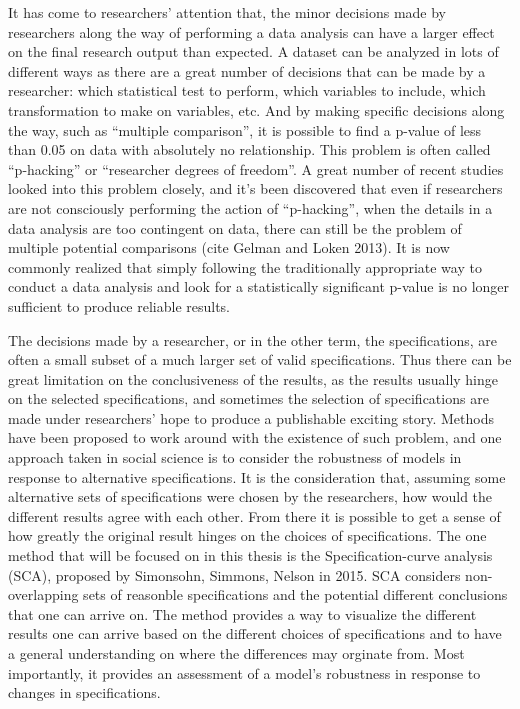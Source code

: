 \documentclass[12pt,twoside]{reedthesis}
\begin{document}
  It has come to researchers' attention that, the minor decisions made by
  researchers along the way of performing a data analysis can have a
  larger effect on the final research output than expected. A dataset can
  be analyzed in lots of different ways as there are a great number of
  decisions that can be made by a researcher: which statistical test to
  perform, which variables to include, which transformation to make on
  variables, etc. And by making specific decisions along the way, such as
  ``multiple comparison'', it is possible to find a p-value of less than
  0.05 on data with absolutely no relationship. This problem is often
  called ``p-hacking'' or ``researcher degrees of freedom''. A great
  number of recent studies looked into this problem closely, and it's been
  discovered that even if researchers are not consciously performing the
  action of ``p-hacking'', when the details in a data analysis are too
  contingent on data, there can still be the problem of multiple potential
  comparisons (cite Gelman and Loken 2013). It is now commonly realized
  that simply following the traditionally appropriate way to conduct a
  data analysis and look for a statistically significant p-value is no
  longer sufficient to produce reliable results.
  
  \par 
  
  The decisions made by a researcher, or in the other term, the
  specifications, are often a small subset of a much larger set of valid
  specifications. Thus there can be great limitation on the conclusiveness
  of the results, as the results usually hinge on the selected
  specifications, and sometimes the selection of specifications are made
  under researchers' hope to produce a publishable exciting story. Methods
  have been proposed to work around with the existence of such problem,
  and one approach taken in social science is to consider the robustness
  of models in response to alternative specifications. It is the
  consideration that, assuming some alternative sets of specifications
  were chosen by the researchers, how would the different results agree
  with each other. From there it is possible to get a sense of how greatly
  the original result hinges on the choices of specifications. The one
  method that will be focused on in this thesis is the Specification-curve
  analysis (SCA), proposed by Simonsohn, Simmons, Nelson in 2015. SCA
  considers non-overlapping sets of reasonble specifications and the
  potential different conclusions that one can arrive on. The method
  provides a way to visualize the different results one can arrive based
  on the different choices of specifications and to have a general
  understanding on where the differences may orginate from. Most
  importantly, it provides an assessment of a model's robustness in
  response to changes in specifications.
  
\end{document}
